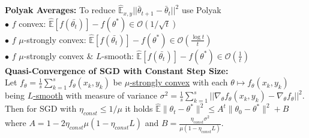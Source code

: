 \textbf{Polyak Averages:} To reduce $\hat{\mathbb E}_{x,y} ||\bar{\theta}_{t+1} - \bar{\theta}_{t}||^2$ use Polyak \\
$\bullet$ $f$ convex: $\hat{\mathbb E}[f(\bar{\theta_t})] - f(\theta^*) \in \mathcal{O}(1/\sqrt{t})$\\
$\bullet$ $f$ $\mu$-strongly convex: $\hat{\mathbb E}[f(\bar{\theta_t})] - f(\theta^*) \in \mathcal{O}(\frac{\log t}{t})$\\
$\bullet$ $f$ $\mu$-strongly convex \& $L$-smooth: $\hat{\mathbb E}[f(\bar{\theta_t})] - f(\theta^*) \in \mathcal{O}(\frac{1}{t})$\\

\textbf{Quasi-Convergence of SGD with Constant Step Size:}\\
Let $f_\theta \!=\! \frac{1}{s} \sum_{k=1}^s f_\theta(x_k, y_k)$ be \underline{$\mu$-strongly convex} with each $\theta \mapsto f_\theta(x_k, y_k)$ being \underline{$L$-smooth} with measure of variance $\sigma^2 =\frac{1}{s}\sum_{k=1}^s||\nabla_\theta f_\theta(x_k, y_k)-\nabla_\theta f_\theta||^2$. Then for SGD with $\eta_{const} \leq1/\mu$ it holds
$\hat{\mathbb{E}}\|\theta_t-\theta^*\|^2\leq A^t\|\theta_0-\theta^*\|^2+B$
where $A=1-2\eta_{const}\mu(1-\eta_{const} L) $ and $B=\frac{\eta_{const}\sigma^2}{\mu(1 - \eta_{const} L)}$.\\

\color{black}


